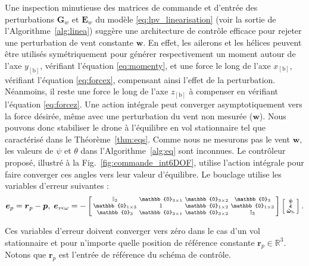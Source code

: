 Une inspection minutieuse des matrices de commande et d'entrée des perturbations $\boldsymbol{G}_{w}$ et $\boldsymbol{E}_{w}$ du modèle \eqref{eq:lpv_linearisation} (voir la sortie de l'Algorithme~\ref{alg:linea}) suggère une architecture de contrôle efficace pour rejeter une perturbation de vent constante $\boldsymbol{w}$. En effet, les ailerons et les hélices peuvent être utilisés symétriquement pour générer respectivement un moment autour de l'axe $y_{[\text{b}]}$, vérifiant l'équation \eqref{eq:momenty}, et une force le long de l'axe $x_{[\text{b}]}$, vérifiant l'équation \eqref{eq:forcex}, compensant ainsi l'effet de la perturbation. Néanmoins, il reste une force le long de l'axe $z_{[\text{b}]}$ à compenser en vérifiant l'équation \eqref{eq:forcez}. Une action intégrale peut converger asymptotiquement vers la force désirée, même avec une perturbation du vent non mesurée ($\boldsymbol{w}$). Nous pouvons donc stabiliser le drone à l'équilibre en vol stationnaire tel que caractérisé dans le Théorème~\ref{thm:eqs}. Comme nous ne mesurons pas le vent $\boldsymbol{w}$, les valeurs de $\psi$ et $\theta$ dans l'Algorithme~\ref{alg:eq} sont inconnues. Le contrôleur proposé, illustré à la Fig.~\ref{fig:commande_int6DOF}, utilise l'action intégrale pour faire converger ces angles vers leur valeur d'équilibre. Le bouclage utilise les variables d'erreur suivantes : 
\begin{align}
    \boldsymbol{e}_{p}= \boldsymbol{r}_{p} - \boldsymbol{p}, \; \boldsymbol{e}_{v \epsilon \omega} = -  
       \left[ \begin{smallmatrix} \mathbb{I}_{3}  & \mathbb{0}_{3\times 1} & \mathbb{0}_{3\times 2} & \mathbb{0}_{3}\\
       \mathbb{0}_{1\times 3}  & 1 & \mathbb{0}_{1\times 2} & \mathbb{0}_{1 \times 3} \\
           \mathbb{0}_{3}  & \mathbb{0}_{3\times 1} & \mathbb{0}_{3\times 2} &   \mathbb{I}_{3}
           \end{smallmatrix} \right]
    \smallmat{
           \tilde{\boldsymbol{v}} \\
           \tilde{\boldsymbol{\epsilon}} \\
           \tilde{\boldsymbol{\omega}}_{\text{b}} 
    }.
  \label{eq:error_var}
\end{align} 

Ces variables d'erreur doivent converger vers zéro dans le cas d'un vol stationnaire et pour n'importe quelle position de référence constante $\boldsymbol{r}_{p} \in \mathbb{R}^{3}$. Notons que $\boldsymbol{r}_{p}$ est l'entrée de référence du schéma de contrôle.

